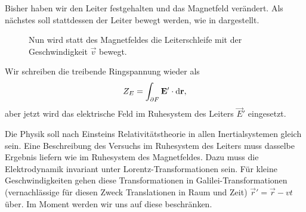 Bisher haben wir den Leiter festgehalten und das Magnetfeld verändert. Als nächstes soll stattdessen der Leiter bewegt werden, wie in  dargestellt. 

\begin{figure}[ht]
	\centering
	\tfigInductionB
	\caption{Nun wird statt des Magnetfeldes die Leiterschleife mit der Geschwindigkeit $\vec v$ bewegt. }
	\label{fig:inductionB}
\end{figure}

Wir schreiben die treibende Ringspannung wieder als
\begin{equation}
	\label{eq:ringspannung_ruhesystem_leiter}
	Z_{E}=\int _{\partial F}\mathbf{E}'\cdot \mathop{}\!\mathrm{d} \mathbf{r},
\end{equation}
aber jetzt wird das elektrische Feld im Ruhesystem des Leiters $\vec {E}'$ eingesetzt.

Die Physik soll nach Einsteins Relativitätstheorie in allen Inertialsystemen gleich sein. Eine Beschreibung des Versuchs im Ruhesystem des Leiters muss dasselbe Ergebnis liefern wie im Ruhesystem des Magnetfeldes. Dazu muss die Elektrodynamik invariant unter Lorentz-Transformationen sein. Für kleine Geschwindigkeiten gehen diese Transformationen in Galilei-Transformationen (vernachlässige für diesen Zweck Translationen in Raum und Zeit) $\vec {r}'=\vec {r}-vt$ über. Im Moment werden wir uns auf diese beschränken.

